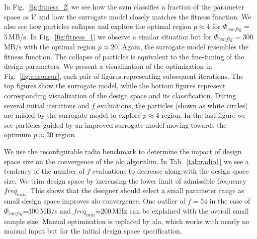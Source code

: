 \documentclass[runningheads,a4paper]{llncs}
\begin{document}
In Fig.~\ref{fig:fitness_2} we see how the \ac{svm} classifies a fraction of the
parameter space as $\mathcal{V}$ and how the surrogate model closely
matches the fitness function. We also see how particles collapse and
explore the optimal region $p\approx4$ for $\Phi_{config}$ = 5\,MB/s.
In Fig.~\ref{fig:fitness_1} we observe a similar situation but
for $\Phi_{config}$ = 300\,MB/s with the optimal region $p\approx20$.
Again, the surrogate model resembles the fitness function.
The collapse of particles is equivalent to the fine-tuning of the design parameters.
We present a visualization of the optimization in Fig.~\ref{fig:ansonsur}, each pair
of figures representing subsequent iterations. The top figures show the surrogate
model, while the bottom figures represent corresponding visualization of the design space and its classification.
During several initial iterations and $f$ evaluations, the particles (shown as white circles)
are misled by the surrogate model to explore $p\approx4$ region. In the last figure we
see particles guided by an improved surrogate model moving towards the optimum $p\approx20$ region.








We use the reconfigurable radio benchmark to determine the impact of design space size on the convergence of the \ac{alo} algorithm. In Tab.~\ref{tab:radio1} we see a tendency of the number of $f$ evaluations to decrease along with the design space size. We trim design space by increasing the lower limit of admissible frequency $freq_{min}$. This shows that the designer should select a small parameter range as small design space improves \ac{alo} convergence. One outlier of $f=54$ in the case of $\Phi_{config}$=300\,MB/s and $freq_{min}$=200\,MHz can be explained with the overall small sample size. Manual optimization is replaced by \ac{alo}, which works with nearly no manual input but for the initial design space specification.
\end{document}
